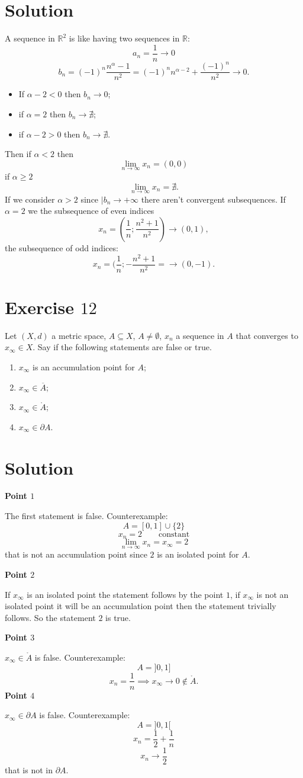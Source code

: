 \documentclass[a4paper, twoside, openany]{book}
\begin{document}
\section*{Solution}
A sequence in $\mathbb{R}^2$ is like having two sequences in $\mathbb{R}$:
$$a_n = \frac{1}{n} \rightarrow 0$$
$$b_n = (-1)^n \frac{n^{\alpha} - 1}{n^2} = (-1)^n n^{\alpha - 2} + \frac{(-1)^n}{n^2} \rightarrow 0.$$
\begin{itemize}
\item If $\alpha - 2 < 0$ then $b_n \rightarrow 0$;
\item if $\alpha = 2$ then $b_n \rightarrow \nexists$;
\item if $\alpha - 2 > 0$ then $b_n \rightarrow \nexists$.
\end{itemize}
Then if $\alpha < 2$ then 
$$\lim_{n \rightarrow \infty} x_n = (0, 0)$$
if $\alpha \geq 2$
$$\lim_{n \rightarrow \infty} x_n = \nexists.$$
If we consider $\alpha > 2$ since $|b_n \rightarrow +\infty$ there aren't convergent subsequences.
If $\alpha = 2$ we the subsequence of even indices
$$x_n = (\frac{1}{n}; \frac{n^2 + 1}{n^2}) \rightarrow (0, 1),$$
the subsequence of odd indices:
$$x_n = (\frac{1}{n}; -\frac{n^2 + 1}{n^2}= \rightarrow (0, -1).$$
\clearpage
\section*{Exercise $12$}
Let $(X, d)$ a metric space, $A \subseteq X$, $A \neq \emptyset$, $x_n$ a sequence in $A$ that converges to $x_{\infty} \in X$. Say if the following statements are false or true.
\begin{enumerate}
\item $x_{\infty}$ is an accumulation point for $A$;
\item $x_{\infty} \in \overline{A}$;
\item $x_{\infty} \in \mathring{A}$;
\item $x_{\infty} \in \partial A$. 
\end{enumerate}
\section*{Solution}
\textbf{Point $1$} \par 
The first statement is false. Counterexample:
$$A = [0, 1] \cup \{ 2 \}$$
$$x_n = 2 \qquad \textrm{constant}$$
$$\lim_{n \rightarrow \infty} x_n = x_{\infty} = 2$$
that is not an accumulation point since $2$ is an isolated point for $A$. \par  
\textbf{Point $2$} \par 
If $x_{\infty}$ is an isolated point the statement follows by the point $1$, if $x_{\infty}$ is not an isolated point it will be an accumulation point then the statement trivially follows. So the statement $2$ is true. \par 
\textbf{Point $3$} \par
$x_{\infty} \in \mathring{A}$ is false. Counterexample:
$$A = ]0, 1]$$
$$x_n = \frac{1}{n} \implies x_{\infty} \rightarrow 0 \notin \mathring{A}.$$
\textbf{Point $4$} \par  
$x_{\infty} \in \partial A$ is false. Counterexample:
$$A = ]0, 1[$$
$$x_n = \frac{1}{2} + \frac{1}{n}$$
$$x_n \rightarrow \frac{1}{2}$$
that is not in $\partial A$.
\clearpage
\end{document}

